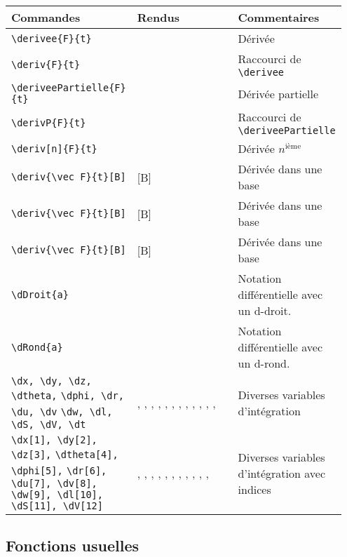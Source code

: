 \documentclass[a4paper,10pt]{article}
\begin{document}
			\noindent
			\begin{tabular}{|p{0.35\linewidth}|p{0.3\linewidth}|p{0.3\linewidth}|}
				\hline
					\textbf{Commandes}&\textbf{Rendus}&\textbf{Commentaires}
				\\\hline\hline
					\verb!\derivee{F}{t}!		&	\derivee {F}{t}			&	Dérivée
				\\\hline
					\verb!\deriv{F}{t}!		&	\deriv {F}{t}			&	Raccourci de \verb!\derivee!
				\\\hline	
					\verb!\deriveePartielle{F}{t}!		&	\deriveePartielle {F}{t}			&	Dérivée partielle
				\\\hline
					\verb!\derivP{F}{t}!		&	\derivP {F}{t}			&	Raccourci de \verb!\deriveePartielle!
				\\\hline
					\verb!\deriv[n]{F}{t}!		&	\deriv[n] {F}{t}			&	Dérivée $n^\text{ième}$
				\\\hline
					\verb!\deriv{\vec F}{t}[B]!		&	\deriv {\vec F}{t}[B]			&	Dérivée dans une base
				\\\hline
					\verb!\deriv{\vec F}{t}[B]!		&	\deriv {\vec F}{t}[B]			&	Dérivée dans une base
				\\\hline
					\verb!\deriv{\vec F}{t}[B]!		&	\deriv {\vec F}{t}[B]			&	Dérivée dans une base
				\\\hline
					\verb!\dDroit{a}!		&		\dDroit{a}		&	Notation différentielle avec un d-droit.
				\\\hline
					\verb!\dRond{a}!		&		\dRond{a}		&	Notation différentielle avec un d-rond.
				\\\hline
					\verb!\dx, \dy, \dz, \dtheta,! \verb!\dphi, \dr, \du, \dv! \verb!\dw, \dl, \dS, \dV, \dt!		&	\dx, \dy, \dz, \dtheta, \dphi, \du, \dv, \dw, \dr, \dl, \dS, \dV, \dt			&	Diverses variables d'intégration
				\\\hline
					\verb!\dx[1], \dy[2], \dz[3],! \verb!\dtheta[4], \dphi[5],! \verb!\dr[6], \du[7], \dv[8],! \verb!\dw[9], \dl[10],! \verb!\dS[11], \dV[12]!		&		\dx[1], \dy[2], \dz[3], \dtheta[4], \dphi[5], \dr[6], \du[7], \dv[8], \dw[9], \dl[10], \dS[11], \dV[12]		&	Diverses variables d'intégration avec indices
				\\\hline
			\end{tabular}


		\subsection{Fonctions usuelles}
\end{document}
